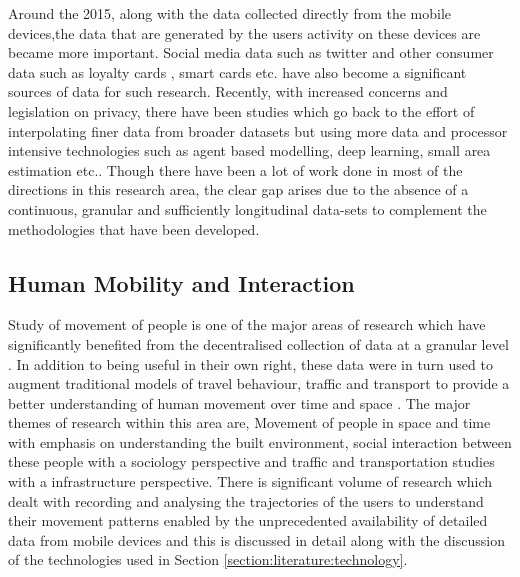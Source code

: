 Around the 2015, along with the data collected directly from the mobile devices,the data that are generated by the users activity on these devices are became more important.
Social media data such as twitter \citep{lansley2016a} and other consumer data such as loyalty cards \citep{lloyd2018}, smart cards \citep{ordonez2012} etc. have also become a significant sources of data for such research.
Recently, with increased concerns and legislation on privacy, there have been studies which go back to the effort of interpolating finer data from broader datasets but using more data and processor intensive technologies such as agent based modelling, deep learning, small area estimation \citep{crols2019, shibata2019, rao2015} etc..
Though there have been a lot of work done in most of the directions in this research area, the clear gap arises due to the absence of a continuous, granular and sufficiently longitudinal data-sets to complement the methodologies that have been developed. 

\subsection{Human Mobility and Interaction}

Study of movement of people is one of the major areas of research which have significantly benefited from the decentralised collection of data at a granular level \cite[-1cm]{castells2000}.
In addition to being useful in their own right, these data were in turn used to augment traditional models of travel behaviour, traffic and transport to provide a better understanding of human movement over time and space \citep{janssens2013}.
The major themes of research within this area are, Movement of people in space and time with emphasis on understanding the built environment, social interaction between these people with a sociology perspective and traffic and transportation studies with a infrastructure perspective.
There is significant volume of research which dealt with recording and analysing the trajectories of the users to understand their movement patterns enabled by the unprecedented availability of detailed data from mobile devices and this is discussed in detail along with the discussion of the technologies used in Section \ref{section:literature:technology}.


